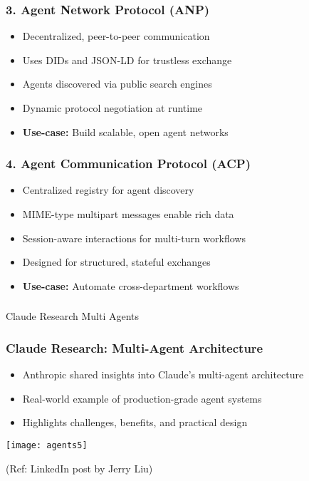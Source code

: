 \begin{frame}[fragile]\frametitle{3. Agent Network Protocol (ANP)}
      \begin{itemize}
        \item Decentralized, peer-to-peer communication
        \item Uses DIDs and JSON-LD for trustless exchange
        \item Agents discovered via public search engines
        \item Dynamic protocol negotiation at runtime
        \item \textbf{Use-case:} Build scalable, open agent networks
      \end{itemize}
\end{frame}

\begin{frame}[fragile]\frametitle{4. Agent Communication Protocol (ACP)}
      \begin{itemize}
        \item Centralized registry for agent discovery
        \item MIME-type multipart messages enable rich data
        \item Session-aware interactions for multi-turn workflows
        \item Designed for structured, stateful exchanges
        \item \textbf{Use-case:} Automate cross-department workflows
      \end{itemize}
\end{frame}


\begin{frame}[fragile]\frametitle{}
\begin{center}
{\Large Claude Research Multi Agents}
\end{center}
\end{frame}

\begin{frame}[fragile]\frametitle{Claude Research: Multi-Agent Architecture}

    \begin{itemize}
        \item Anthropic shared insights into Claude's multi-agent architecture
        \item Real-world example of production-grade agent systems
        \item Highlights challenges, benefits, and practical design
    \end{itemize}
  
	
	\begin{center}
	\texttt{[image: agents5]}
	\end{center}
	
{\tiny (Ref: LinkedIn post by Jerry Liu)}

\end{frame}

